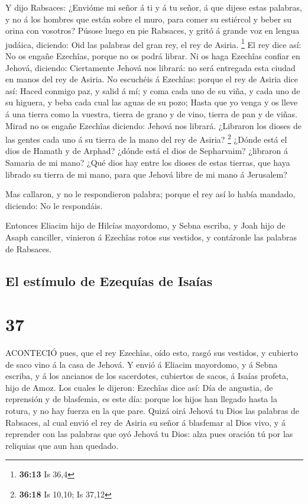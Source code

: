  Y dijo Rabsaces: ¿Envióme mi señor á ti y á tu señor, á
que dijese estas palabras, y no á los hombres que están sobre el muro,
para comer su estiércol y beber su orina con vosotros? 
Púsose luego en pie Rabsaces, y gritó á grande voz en lengua judáica,
diciendo: Oid las palabras del gran rey, el rey de Asiria. \footnote{\textbf{36:13}
  Is 36,4}  El rey dice así: No os engañe Ezechîas, porque
no os podrá librar.  Ni os haga Ezechîas confiar en Jehová,
diciendo: Ciertamente Jehová nos librará: no será entregada esta ciudad
en manos del rey de Asiria.  No escuchéis á Ezechîas:
porque el rey de Asiria dice así: Haced conmigo paz, y salid á mí; y
coma cada uno de su viña, y cada uno de su higuera, y beba cada cual las
aguas de su pozo;  Hasta que yo venga y os lleve á una
tierra como la vuestra, tierra de grano y de vino, tierra de pan y de
viñas.  Mirad no os engañe Ezechîas diciendo: Jehová nos
librará. ¿Libraron los dioses de las gentes cada uno á su tierra de la
mano del rey de Asiria? \footnote{\textbf{36:18} Is 10,10; Is 37,12}
 ¿Dónde está el dios de Hamath y de Arphad? ¿dónde está el
dios de Sepharvaim? ¿libraron á Samaria de mi mano?  ¿Qué
dios hay entre los dioses de estas tierras, que haya librado su tierra
de mi mano, para que Jehová libre de mi mano á Jerusalem?

 Mas callaron, y no le respondieron palabra; porque el rey
así lo había mandado, diciendo: No le respondáis.

 Entonces Eliacim hijo de Hilcías mayordomo, y Sebna
escriba, y Joah hijo de Asaph canciller, vinieron á Ezechîas rotos sus
vestidos, y contáronle las palabras de Rabsaces.

\hypertarget{el-estuxedmulo-de-ezequuxedas-de-isauxedas}{%
\subsection{El estímulo de Ezequías de
Isaías}\label{el-estuxedmulo-de-ezequuxedas-de-isauxedas}}

\hypertarget{section-36}{%
\section{37}\label{section-36}}

 ACONTECIÓ pues, que el rey Ezechîas, oído esto, rasgó sus
vestidos, y cubierto de saco vino á la casa de Jehová.  Y
envió á Eliacim mayordomo, y á Sebna escriba, y á los ancianos de los
sacerdotes, cubiertos de sacos, á Isaías profeta, hijo de Amoz.
 Los cuales le dijeron: Ezechîas dice así: Día de angustia,
de reprensión y de blasfemia, es este día: porque los hijos han llegado
hasta la rotura, y no hay fuerza en la que pare.  Quizá oirá
Jehová tu Dios las palabras de Rabsaces, al cual envió el rey de Asiria
su señor á blasfemar al Dios vivo, y á reprender con las palabras que
oyó Jehová tu Dios: alza pues oración tú por las reliquias que aun han
quedado.

